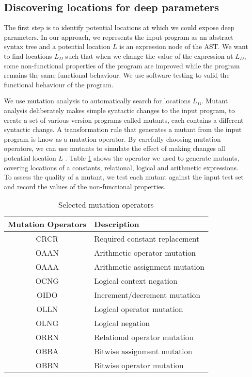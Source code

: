 \subsection{Discovering locations for deep parameters}

The first step is to identify potential locations at which we could expose deep parameters. 
In our approach, we represents the input program as an abstract syntax tree and a potential location $L$ is an expression node of the AST. 
We want to find locations $L_D$ such that when we change the value of the expression at $L_D$, some non-functional properties of the program are improved while the program remains the same functional behaviour. 
We use software testing to valid the functional behaviour of the program. 

We use mutation analysis to automatically search for locations $L_D$. Mutant analysis deliberately makes simple syntactic changes to the input program, to create a set of various version programs called mutants, each contains a different syntactic change. A transformation rule that generates a mutant from the input program is know as a mutation operator. By carefully choosing mutation operators, we can use mutants to simulate the effect of making changes all potential location $L$ . Table \ref{tab:cmop} shows the operator we used to generate mutants, covering locations of a constants, relational, logical and arithmetic expressions. 
To assess the quality of a mutant, we test each mutant against the input test set and record the values of the non-functional properties. 

\begin{table} [htbp]
\caption{Selected mutation operators}
\label{tab:cmop} 
\begin{center}
\begin{tabular}{ | c | l |}
  \hline
  Mutation Operators & Description \\ 
\hline
  CRCR & Required constant replacement \\
  OAAN & Arithmetic operator mutation \\
  OAAA & Arithmetic assignment mutation \\
  OCNG & Logical context negation \\
  OIDO & Increment/decrement mutation  \\
  OLLN & Logical operator mutation  \\ 
  OLNG & Logical negation \\
  ORRN & Relational operator mutation \\
  OBBA & Bitwise assignment mutation \\
  OBBN & Bitwise operator mutation \\
\hline
\end{tabular} 
\end{center} 
\end{table} 

